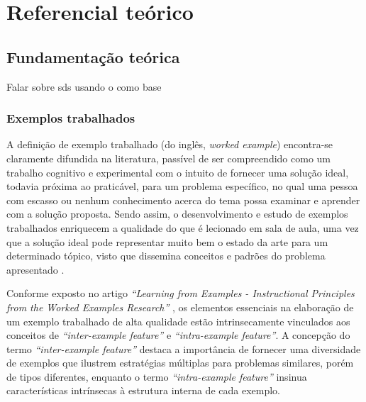 \chapter{Referencial teórico}
\label{cap:referencialTeorico}


\section{Fundamentação teórica}
\label{section:background}
Falar sobre \gls{sds} usando o \cite{DistributedSystemsCoulouris} como base

\subsection{Exemplos trabalhados}

A definição de exemplo trabalhado (do inglês, \textit{worked example}) encontra-se claramente difundida na literatura, passível de ser compreendido como um trabalho cognitivo e experimental com o intuito de fornecer uma solução ideal, todavia próxima ao praticável, para um problema específico, no qual uma pessoa com escasso ou nenhum conhecimento acerca do tema possa examinar e aprender com a solução proposta. Sendo assim, o desenvolvimento e estudo de exemplos trabalhados enriquecem a qualidade do que é lecionado em sala de aula, uma vez que a solução ideal pode representar muito bem o estado da arte para um determinado tópico, visto que dissemina conceitos e padrões do problema apresentado \cite{Robert.Atkinson-etal:2000}.

Conforme exposto no artigo \textit{``Learning from Examples - Instructional Principles from the Worked Examples Research''} \cite{Robert.Atkinson-etal:2000}, os elementos essenciais na elaboração de um exemplo trabalhado de alta qualidade estão intrinsecamente vinculados aos conceitos de \textit{``inter-example feature''} e \textit{``intra-example feature''}. A concepção do termo \textit{``inter-example feature''} destaca a importância de fornecer uma diversidade de exemplos que ilustrem estratégias múltiplas para problemas similares, porém de tipos diferentes, enquanto o termo \textit{``intra-example feature''} insinua características intrínsecas à estrutura interna de cada exemplo. 

